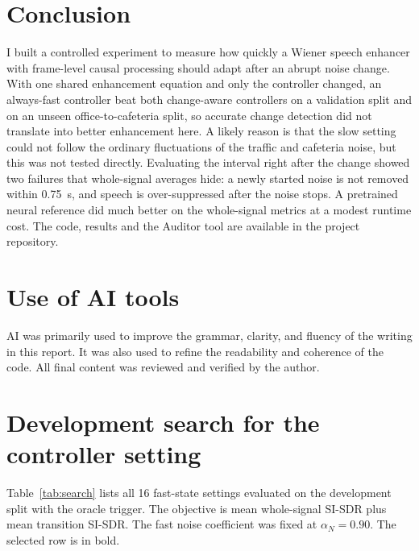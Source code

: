 \documentclass[10pt,conference,a4paper]{IEEEtran}
\begin{document}
\section{Conclusion}
I built a controlled experiment to measure how quickly a Wiener speech enhancer
with frame-level causal processing should adapt after an abrupt noise change.
With one shared enhancement equation and only the controller changed, an
always-fast controller beat both change-aware controllers on a validation split
and on an unseen office-to-cafeteria split, so accurate change detection did not
translate into better enhancement here. A likely reason is that the slow setting
could not follow the ordinary fluctuations of the traffic and cafeteria noise,
but this was not tested directly. Evaluating the interval right after the change
showed two failures that whole-signal averages hide: a newly started noise is
not removed within 0.75~s, and speech is over-suppressed after the noise stops.
A pretrained neural reference did much better on the whole-signal metrics at a
modest runtime cost. The code, results and the Auditor tool are available in the
project repository.

\section*{Use of AI tools}
AI was primarily used to improve the grammar, clarity, and fluency of the writing in this report. It was also used to refine the readability and coherence of the code. All final content was reviewed and verified by the author.




\clearpage
\appendices

\section{Development search for the controller setting}
\label{app:search}
Table~\ref{tab:search} lists all 16 fast-state settings evaluated on the
development split with the oracle trigger. The objective is mean whole-signal
SI-SDR plus mean transition SI-SDR. The fast noise coefficient was fixed at
$\alpha_N=0.90$. The selected row is in bold.
\end{document}
